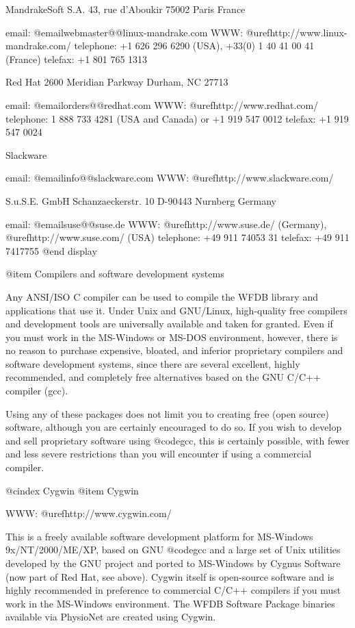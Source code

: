 {{{{{{{{{MandrakeSoft S.A.
43, rue d'Aboukir
75002 Paris
France

email: @email{webmaster@@linux-mandrake.com}
WWW: @uref{http://www.linux-mandrake.com/}
telephone: +1 626 296 6290 (USA), +33(0) 1 40 41 00 41 (France)
telefax: +1 801 765 1313


Red Hat
2600 Meridian Parkway
Durham, NC 27713

email: @email{orders@@redhat.com}
WWW: @uref{http://www.redhat.com/}
telephone: 1 888 733 4281 (USA and Canada) or +1 919 547 0012
telefax: +1 919 547 0024


Slackware

email: @email{info@@slackware.com}
WWW: @uref{http://www.slackware.com/}


S.u.S.E. GmbH
Schanzaeckerstr. 10
D-90443 Nurnberg
Germany

email: @email{suse@@suse.de}
WWW: @uref{http://www.suse.de/} (Germany), @uref{http://www.suse.com/} (USA)
telephone: +49 911 74053 31
telefax: +49 911 7417755
@end display

@item Compilers and software development systems

Any ANSI/ISO C compiler can be used to compile the WFDB library and
applications that use it.  Under Unix and GNU/Linux, high-quality free
compilers and development tools are universally available and taken for
granted.  Even if you must work in the MS-Windows or MS-DOS environment,
however, there is no reason to purchase expensive, bloated, and inferior
proprietary compilers and software development systems, since there are several
excellent, highly recommended, and completely free alternatives based on the
GNU C/C++ compiler (gcc).

Using any of these packages does not limit you to creating free (open
source) software, although you are certainly encouraged to do so.  If you
wish to develop and sell proprietary software using @code{gcc}, this is
certainly possible, with fewer and less severe restrictions than you
will encounter if using a commercial compiler.

@cindex Cygwin
@item Cygwin

WWW: @uref{http://www.cygwin.com/}

This is a freely available software development platform for MS-Windows
9x/NT/2000/ME/XP, based on GNU @code{gcc} and a large set of Unix
utilities developed by the GNU project and ported to MS-Windows by
Cygnus Software (now part of Red Hat, see above).  Cygwin itself is
open-source software and is highly recommended in preference to
commercial C/C++ compilers if you must work in the MS-Windows
environment.  The WFDB Software Package binaries available via PhysioNet
are created using Cygwin.

}}}}}}}}}
